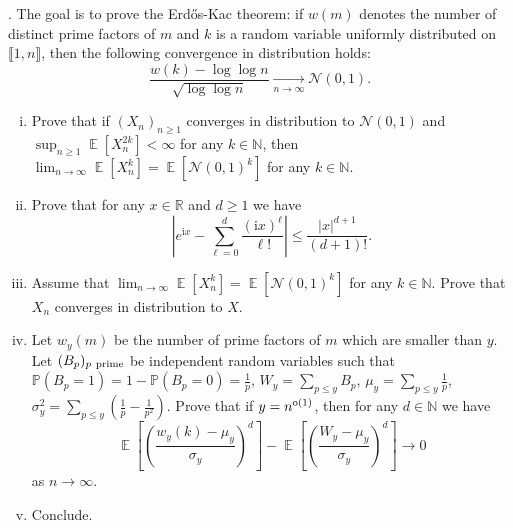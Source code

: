 \documentclass[11pt,reqno]{amsart}
\DeclareMathOperator{\E}{\mathbb{E}}      %
\newcommand{\1}{\mathds{1}}
\newcommand{\ii}{{\mathrm{i}}}
\theoremstyle{definition}
\theoremstyle{remark}
\numberwithin{equation}{section}
\begin{document}
.
The goal is to prove the Erd{\H o}s-Kac theorem: if $w(m)$ denotes the number of distinct prime factors of $m$ and $k$ is a random variable uniformly distributed on $\llbracket 1,n\rrbracket$, then the following convergence in distribution holds:
$$
\frac{w(k)-\log\log n}{\sqrt{\log\log n}}\underset{n\to\infty}{\longrightarrow} \mathscr{N}(0,1).
$$
\begin{enumerate}[(i)]
\item Prove that if $(X_n)_{n\geq 1}$ converges in distribution to $\mathscr{N}(0,1)$ and $\sup_{n\geq 1}\E[X_n^{2k}]<\infty$ for any $k\in\mathbb{N}$, then $\lim_{n\to\infty}\E[X_n^k]=\E[\mathscr{N}(0,1)^k]$ for any $k\in\mathbb{N}$.
\item Prove that for any $x\in\mathbb{R}$ and $d\geq 1$ we have $$\left|e^{\ii x}-\sum_{\ell=0}^d\frac{(\ii x)^\ell}{\ell!}\right|\leq \frac{|x|^{d+1}}{(d+1)!}.$$
\item Assume that $\lim_{n\to\infty}\E[X_n^k]=\E[\mathscr{N}(0,1)^k]$ for any $k\in\mathbb{N}$.  Prove that $X_n$ converges in distribution to $X$. 
\item Let $w_y(m)$ be the number of prime factors of $m$ which are smaller than $y$.  Let $(B_p)_{p\ {\rm prime}}$ be independent random variables such that $\mathbb{P}(B_p=1)=1-\mathbb{P}(B_p=0)=\frac{1}{p}$,  $W_y=\sum_{p\leq y} B_p$, $\mu_y=\sum_{p\leq y}\frac{1}{p}$, $\sigma_y^2=\sum_{p\leq y}(\frac{1}{p}-\frac{1}{p^2})$. Prove that if $y=n^{{\rm o}(1)}$, then for any $d\in\mathbb{N}$ we have
$$
\E\left[\left(\frac{w_y(k)-\mu_y}{\sigma_y}\right)^d\right]-\E\left[\left(\frac{W_y-\mu_y}{\sigma_y}\right)^d\right]\to 0
$$ 
as $n\to\infty$.
\item Conclude.
\end{enumerate}
\end{document}
